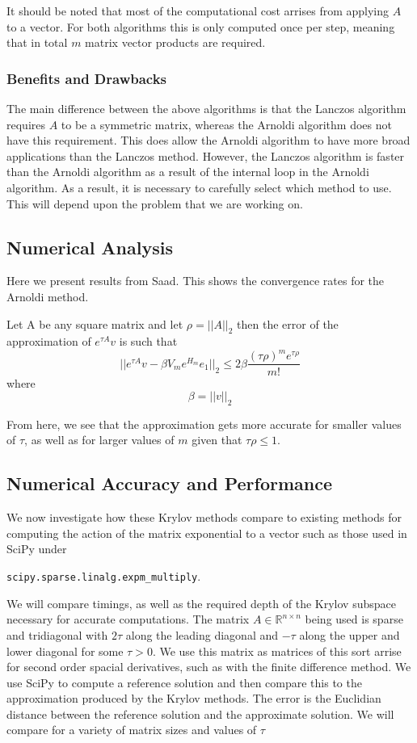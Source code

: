 It should be noted that most of the computational cost arrises from applying $A$ to a vector.
For both algorithms this is only computed once per step, meaning that in total $m$ matrix vector products are required.
\subsubsection{Benefits and Drawbacks}
The main difference between the above algorithms is that the Lanczos algorithm requires $A$ to be a symmetric matrix, whereas the Arnoldi algorithm does not have this requirement.
This does allow the Arnoldi algorithm to have more broad applications than the Lanczos method.
However, the Lanczos algorithm is faster than the Arnoldi algorithm as a result of the internal loop in the Arnoldi algorithm.
As a result, it is necessary to carefully select which method to use.
This will depend upon the problem that we are working on.

\subsection{Numerical Analysis}
Here we present results from Saad\cite{Saad1992}. This shows the convergence rates for the Arnoldi method.

\begin{theorem}
    Let A be any square matrix and let \(\rho=||A||_2\) then the error of the approximation of \(e^{\tau A}v\) is such that
    \[ ||e^{\tau A}v - \beta V_m e^{H_m}e_1||_2 \leq 2\beta \frac{(\tau \rho)^m e^{\tau \rho}}{m!} \] where \[\beta = ||v||_2\]
\end{theorem}
From here, we see that the approximation gets more accurate for smaller values of $\tau$, as well as for larger values of $m$ given that $\tau \rho\leq1$.

\subsection{Numerical Accuracy and Performance}
We now investigate how these Krylov methods compare to existing methods for computing the action of the matrix exponential to a vector such as those used in SciPy under 

\verb|scipy.sparse.linalg.expm_multiply|\cite{AlMohy2011}\cite{Higham2010}.

We will compare timings, as well as the required depth of the Krylov subspace necessary for accurate computations.
The matrix $A \in \mathbb{R}^{n \times n}$ being used is sparse and tridiagonal with $2\tau$ along the leading diagonal and $-\tau$ along the upper and lower diagonal for some $\tau > 0$.
We use this matrix as matrices of this sort arrise for second order spacial derivatives, such as with the finite difference method.
We use SciPy to compute a reference solution and then compare this to the approximation produced by the Krylov methods.
The error is the Euclidian distance between the reference solution and the approximate solution.
We will compare for a variety of matrix sizes and values of $\tau$

